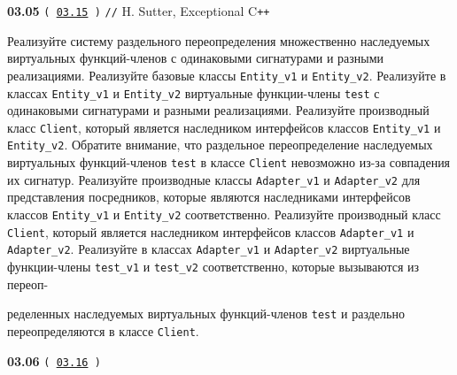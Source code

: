 \documentclass[a4paper,12pt]{article}
\begin{document}
\bigskip

{\large \textbf{03.05} \texttt{(\,\href{https://github.com/i-s-m-mipt/Education/blob/master/projects/examples/source/03.15.cpp}{03.15}\,)} \texttt{//} H. Sutter, Exceptional C\texttt{++}}

\bigskip

Реализуйте систему раздельного переопределения множественно наследуемых виртуальных функций-членов с одинаковыми сигнатурами и разными реализациями. Реализуйте базовые классы \lstinline{Entity_v1} и \lstinline{Entity_v2}. Реализуйте в классах \lstinline{Entity_v1} и \lstinline{Entity_v2} виртуальные функции-члены \lstinline{test} с одинаковыми сигнатурами и разными реализациями. Реализуйте производный класс \lstinline{Client}, который является наследником интерфейсов классов \lstinline{Entity_v1} и \lstinline{Entity_v2}. Обратите внимание, что раздельное переопределение наследуемых виртуальных функций-членов \lstinline{test} в классе \lstinline{Client} невозможно из-за совпадения их сигнатур. Реализуйте производные классы \lstinline{Adapter_v1} и \lstinline{Adapter_v2} для представления посредников, которые являются наследниками интерфейсов классов \lstinline{Entity_v1} и \lstinline{Entity_v2} соответственно. Реализуйте производный класс \lstinline{Client}, который является наследником интерфейсов классов \lstinline{Adapter_v1} и \lstinline{Adapter_v2}. Реализуйте в классах \lstinline{Adapter_v1} и \lstinline{Adapter_v2} виртуальные функции-члены \lstinline{test_v1} и \lstinline{test_v2} соответственно, которые вызываются из переоп- 

ределенных наследуемых виртуальных функций-членов \lstinline{test} и раздельно переопределяются в классе \lstinline{Client}.

\bigskip

{\large \textbf{03.06} \texttt{(\,\href{https://github.com/i-s-m-mipt/Education/blob/master/projects/examples/source/03.16.cpp}{03.16}\,)}}

\bigskip
\end{document}
